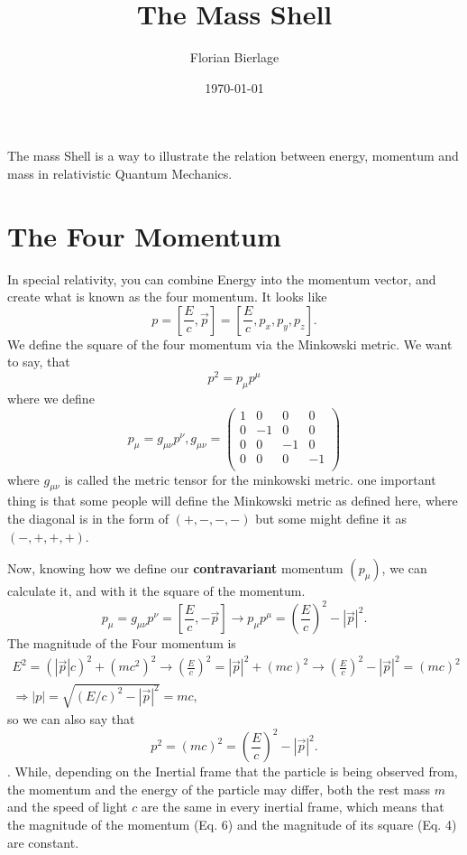 \documentclass[]{scrartcl}
\title{The Mass Shell}
\author{Florian Bierlage}
\date{\today}
\begin{document}
\maketitle
\newpage
\tableofcontents
\newpage

The mass Shell is a way to illustrate the relation between energy, momentum and mass in relativistic Quantum Mechanics.

\section{The Four Momentum}

In special relativity, you can combine Energy into the momentum vector, and create what is known as the four momentum. It looks like
\begin{equation}
	p = \left[\frac{E}{c}, \vec{p}\right] = \left[\frac{E}{c},p_x, p_y, p_z\right].
\end{equation}
We define the square of the four momentum via the Minkowski metric. We want to say, that
\begin{equation}
	p^2 = p_\mu p^\mu
\end{equation}
where we define
\begin{equation}
	p_\mu = g_{\mu\nu}p^\nu, g_{\mu\nu} = \begin{pmatrix}
		1 & 0 & 0 & 0\\
		0 & -1 & 0 & 0\\
		0 & 0 & -1 & 0\\
		0 & 0 & 0 & -1\\
	\end{pmatrix}
\end{equation}
where $g_{\mu\nu}$ is called the metric tensor for the minkowski metric. one important thing is that some people will define the Minkowski metric as defined here, where the diagonal is in the form of $(+, -, -, -)$ but some might define it as $(-, +, +, +)$.

Now, knowing how we define our \textbf{contravariant} momentum $(p_\mu)$, we can calculate it, and with it the square of the momentum.
\begin{equation}
	p_\mu = g_{\mu\nu}p^\nu = \left[\frac{E}{c}, -\vec{p}\right] \rightarrow p_\mu p^\mu = \left(\frac{E}{c}\right)^2 - |\vec{p}|^2.
\end{equation}
The magnitude of the Four momentum is
\begin{gather}
	E^2 = (|\vec{p}|c)^2 + (mc^2)^2 \rightarrow \left(\frac{E}{c}\right)^2 = |\vec{p}|^2 + (mc)^2 \rightarrow \left(\frac{E}{c}\right)^2 - |\vec{p}|^2 = (mc)^2\\
	\Rightarrow |p| = \sqrt{(E/c)^2 - |\vec{p}|^2} = mc,
\end{gather}
so we can also say that
\begin{equation}
	p^2 = (mc)^2 = \left(\frac{E}{c}\right)^2 - |\vec{p}|^2.
\end{equation}.
While, depending on the Inertial frame that the particle is being observed from, the momentum and the energy of the particle may differ, both the rest mass $m$ and the speed of light $c$ are the same in every inertial frame, which means that the magnitude of the momentum (Eq. 6) and the magnitude of its square (Eq. 4) are constant.
\end{document}
